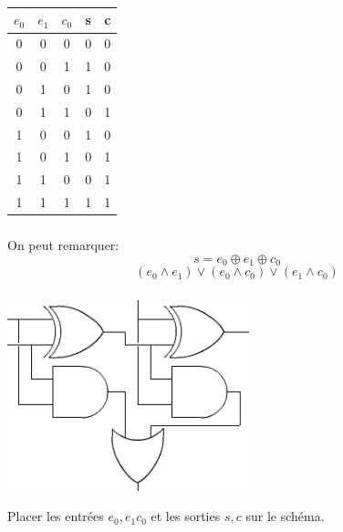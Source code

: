 \documentclass[svgnames,11pt]{beamer}
\begin{document}
\begin{frame}
    \frametitle{}

    \begin{center}
        \begin{tabular}{|c|c|c||c|c|}
            \hline
            $e_0$ & $e_1$ & $c_0$ & s&c \\
            \hline
            0 & 0 & 0 & 0 &      0           \\
            \hline
            0 & 0 & 1 &  1    &   0         \\
            \hline
            0 & 1 & 0 &  1  &    0           \\
            \hline
            0 & 1 & 1 &  0 &     1         \\
            \hline
            1 & 0 & 0 &  1  &    0          \\
            \hline
            1 & 0 & 1 &  0 &     1          \\
            \hline
            1 & 1 & 0 &  0 &     1        \\
            \hline
            1 & 1 & 1 &  1&      1         \\
            \hline
        \end{tabular}
    \end{center}

\end{frame}
\begin{frame}
    \frametitle{}

    On peut remarquer:
    {\Large $$s=e_0\oplus e_1 \oplus c_0$$
    $$(e_0 \land e_1)\lor (e_0\land c_0)\lor (e_1\land c_0)$$}

\end{frame}
\begin{frame}
    \frametitle{}

    \begin{center}
    \centering
    \includegraphics[width=7cm]{ressources/additionneur.png}
    \label{IMG}
    \end{center}
\begin{activite}
Placer les entrées $e_0, e_1 c_0$ et les sorties $s,c$ sur le schéma.
\end{activite}
\end{frame}
\end{document}
